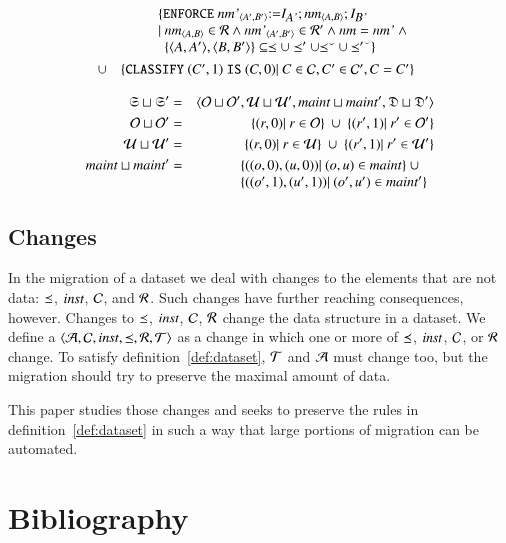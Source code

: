 \documentclass{elsarticle}
\begin{document}
\begin{definition}
	\begin{eqnarray}
		&&\begin{array}[t]{@{}l}
			\{ {\tt ENFORCE\ }\declare{nm'}{A'}{B'}{\tt := }\ident{A'};\declare{nm}{A}{B};\ident{B'}\\
				|\ \begin{array}[t]{@{}l}
					\declare{nm}{A}{B}\in\rels\wedge\declare{nm'}{A'}{B'}\in\rels'\wedge\id{nm}=\id{nm'}\ \wedge\\
					\{\pair{A}{A'},\pair{B}{B'}\}\subseteq\isa\cup\isa'\cup\flip{\isa}\cup\flip{\isa'}\}
				   \end{array}
			  \end{array}\\
			  &\cup&\begin{array}[t]{@{}l}
				\{ {\tt CLASSIFY\ }(C',1){\tt\ IS\ }(C,0)|\ C\in\concepts,C'\in\concepts',C=C'\}\\
			  \end{array}
	\end{eqnarray}
\end{definition}
\begin{definition}
	\begin{eqnarray}
		\infsys\sqcup\infsys'&=&\la\roles\sqcup\roles',\rules\sqcup\rules',\maintain\sqcup\maintain',\dataset\sqcup\dataset'\ra\\
		\roles\sqcup\roles'&=&\{(r,0)|\ r\in\roles\}\ \cup\ \{(r',1)|\ r'\in\roles'\}\\
		\rules\sqcup\rules'&=&\{(r,0)|\ r\in\rules\}\ \cup\ \{(r',1)|\ r'\in\rules'\}\\
		\maintain\sqcup\maintain'&=&\begin{array}[t]{@{}l}
							  \{((o,0),(u,0))|\ (o,u)\in\maintain\}\ \cup\\
			                  \{((o',1),(u',1))|\ (o',u')\in\maintain'\}
							\end{array}
	\end{eqnarray}
\end{definition}

\subsection{Changes}
	In the migration of a dataset we deal with changes to the elements that are not data:
	$\preceq$, $\text{\it inst\/}$, $\mathcal{C}$, and $\mathcal{R}$.
	Such changes have further reaching consequences, however.
	Changes to $\preceq$, $\text{\it inst\/}$, $\mathcal{C}$, $\mathcal{R}$ change the data structure in a dataset.
	We define a  $\langle\mathcal{A},\mathcal{C},\text{\it inst\/},\preceq,\mathcal{R},\mathcal{T}\rangle$ as a change in which one or more of $\preceq$, $\text{\it inst\/}$, $\mathcal{C}$, or $\mathcal{R}$ change.
	To satisfy definition~\ref{def:dataset}, $\mathcal{T}$ and $\mathcal{A}$ must change too,
	but the migration should try to preserve the maximal amount of data.

	This paper studies those changes and seeks to preserve the rules in definition~\ref{def:dataset}
	in such a way that large portions of migration can be automated.


\section{Bibliography}


\end{document}
